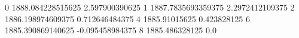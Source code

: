 0 1888.084228515625 2.597900390625
1 1887.7835693359375 2.2972412109375
2 1886.198974609375 0.712646484375
4 1885.91015625 0.423828125
6 1885.390869140625 -0.095458984375
8 1885.486328125 0.0
